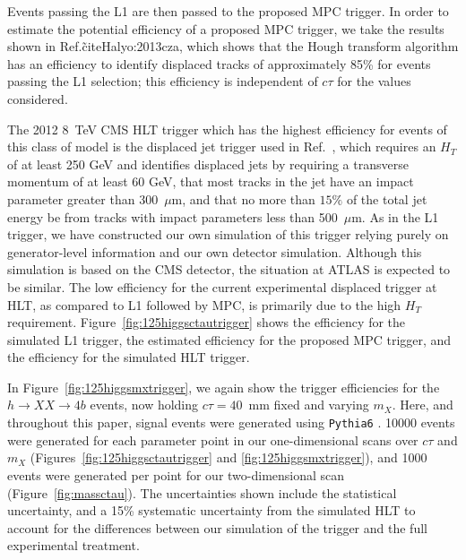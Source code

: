\documentclass[aps,prl,twocolumn,preprintnumbers,groupedaddress,nofootinbib]{revtex4}
\begin{document}
Events passing the L1 are then passed to the proposed MPC trigger. In order to estimate the potential efficiency of a proposed MPC trigger, we take the results shown in Ref.\~cite{Halyo:2013cza}, which shows that the Hough transform algorithm has an efficiency to identify displaced tracks of approximately 85\% for events passing the L1 selection; this efficiency is independent of $c\tau$ for the values considered.

The 2012 8~TeV CMS HLT trigger which has the highest efficiency for events of this class of model is the displaced jet trigger used in Ref.~\cite{CMS:2014wda}, which requires an $H_T$ of at least 250 GeV and identifies displaced jets by requiring a transverse momentum of at least 60 GeV, that most tracks in the jet have an impact parameter greater than 300~$\mu$m, and that no more than $15\%$ of the total jet energy be from tracks with impact parameters less than 500~$\mu$m. As in the L1 trigger, we have constructed our own simulation of this trigger relying purely on generator-level information and our own detector simulation. Although this simulation is based on the CMS detector, the situation at ATLAS is expected to be similar. The low efficiency for the current experimental displaced trigger at HLT, as compared to L1 followed by MPC, is primarily due to the high $H_T$ requirement. Figure~\ref{fig:125higgsctautrigger} shows the efficiency for the simulated L1 trigger, the estimated efficiency for the proposed MPC trigger, and the efficiency for the simulated HLT trigger.

In Figure~\ref{fig:125higgsmxtrigger}, we again show the trigger efficiencies for the $h \to XX \to 4b$ events, now holding $c\tau =  40$~mm fixed and varying $m_X$. Here, and throughout this paper, signal events were generated using {\tt Pythia6} \cite{Sjostrand:2006za}. 10000 events were generated for each parameter point in our one-dimensional scans over $c\tau$ and $m_X$ (Figures~\ref{fig:125higgsctautrigger} and \ref{fig:125higgsmxtrigger}), and 1000 events were generated per point for our two-dimensional scan (Figure~\ref{fig:massctau}). The uncertainties shown include the statistical uncertainty, and a 15\% systematic uncertainty from the simulated HLT to account for the differences between our simulation of the trigger and the full experimental treatment.
\end{document}
